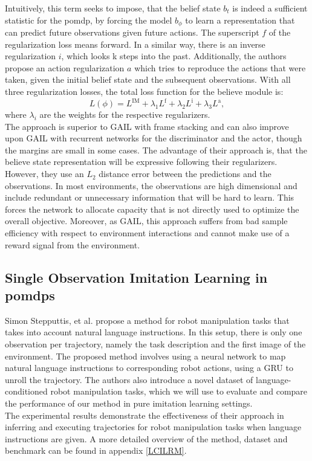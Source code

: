 Intuitively, this term seeks to impose, that the belief state $b_t$ is indeed a sufficient statistic for the 
\ac{pomdp}, by forcing the model $b_{\phi}$ to learn a representation that can predict future observations given future actions. The superscript $f$ of the regularization loss means forward. 
In a similar way, there is an inverse regularization $i$, which looks k steps into the past. Additionally, the authors propose an action regularization $a$ which tries to reproduce the actions that were 
taken, given the initial belief state and the subsequent observations. With all three regularization losses, the total loss function for the believe module is:
\begin{equation}
    L(\phi) = L^\text{IM} + \lambda_1 L^\text{f} + \lambda_2 L^\text{i} + \lambda_3 L^\text{a},
\end{equation}
where $\lambda_i$ are the weights for the respective regularizers. \\
The approach is superior to GAIL with frame stacking and can also improve upon GAIL with recurrent networks for the discriminator and the actor, though the margins are small in some cases. The advantage 
of their approach is, that the believe state representation will be expressive following their regularizers. However, they use an $L_2$ distance error between the predictions and the observations. In most environments, 
the observations are high dimensional and include redundant or unnecessary information that will be hard to learn. This forces the network to allocate capacity that is not directly used to 
optimize the overall objective. Moreover, as GAIL, this approach suffers from bad sample efficiency with respect to environment interactions and cannot make use of a reward signal from the environment. 

\subsection{Single Observation Imitation Learning in \ac{pomdp}s}
Simon Stepputtis, et al. \cite{stepputtis2020languageconditioned} propose a method for robot manipulation tasks that takes 
into account natural language instructions. 
In this setup, there is only one observation per trajectory, namely the task description and the first image of the environment.
The proposed method involves using a neural network to map natural language instructions to 
corresponding robot actions, using a GRU to unroll the trajectory. The authors also introduce a novel dataset of language-conditioned robot manipulation tasks, which we will use to evaluate 
and compare the performance of our method in pure imitation learning settings.\\ 
The experimental results demonstrate the effectiveness of their approach in inferring and executing trajectories for robot manipulation 
tasks when language instructions are given. A more detailed overview of the method, dataset and benchmark can be found in appendix \ref{LCILRM}.\\


